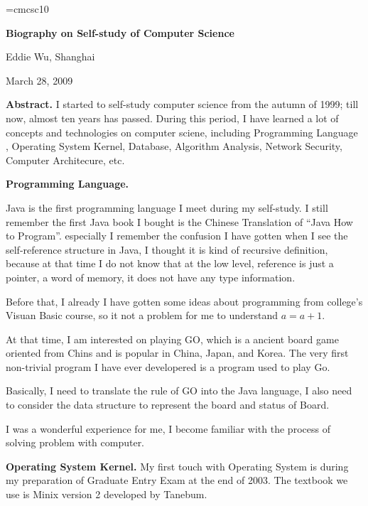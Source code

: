
\magnification\magstephalf
\parskip3pt
\baselineskip14pt
\def\AW{Addison\kern.1em--Wesley}
\font\sc=cmcsc10 %


\centerline{\bf Biography on Self-study of Computer Science}
\bigskip
\centerline{Eddie Wu, Shanghai}
\bigskip
\centerline{March 28, 2009}
\bigskip
{
\baselineskip12pt

{\narrower\smallskip\noindent
{\bf Abstract.} I started to self-study computer science from the autumn of 
1999; till now, almost ten years has passed. During this period, I have
learned a lot of concepts and technologies on computer sciene, including 
Programming Language%
, Operating System Kernel, Database, Algorithm Analysis, Network Security, 
Computer Architecure, etc.
\smallskip}

}



\medskip\noindent
{\bf Programming Language.}

Java is the first programming language I meet during my self-study. I still 
remember the first Java book I bought is the Chinese Translation of ``Java How 
to Program''. especially I remember the confusion I have gotten when I see the 
self-reference structure in Java, I thought it is kind of recursive definition, 
because at that time I do not know that at 
the low level, reference is just a pointer, a word of memory, it does not have 
any type information. 

Before that, I already I have gotten some ideas about programming from college's 
Visuan Basic course, so it not a problem for me to understand $a=a+1$.

At that time, I am interested on playing GO, which is a ancient board game 
oriented from Chins and is popular in China, Japan, and Korea. The very first 
non-trivial program I have ever developered is a program used to play Go.

Basically, I need to translate the rule of GO into the Java language, I also 
need to consider the data structure to represent the board and status of Board.

I was a wonderful experience for me, I become familiar with the process of 
solving problem with computer.

\medskip\noindent
{\bf Operating System Kernel.}
My first touch with Operating System is during my preparation of Graduate Entry
Exam at the end of 2003. The textbook we use is Minix version 2 developed by 
Tanebum.%


